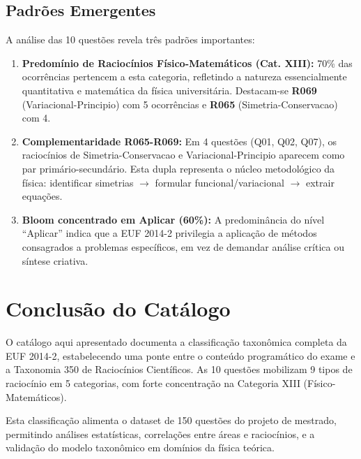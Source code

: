 \documentclass[12pt,a4paper]{article}
\newcommand{\rcode}[1]{\textcolor{azulprof}{\textbf{#1}}}
\begin{document}
\subsection{Padrões Emergentes}

A análise das 10 questões revela três padrões importantes:

\begin{enumerate}
  \item \textbf{Predomínio de Raciocínios Físico-Matemáticos (Cat. XIII):}
    70\% das ocorrências pertencem a esta categoria, refletindo a natureza
    essencialmente quantitativa e matemática da física universitária.
    Destacam-se \rcode{R069} (Variacional-Principio) com 5 ocorrências
    e \rcode{R065} (Simetria-Conservacao) com 4.

  \item \textbf{Complementaridade R065-R069:} Em 4 questões (Q01, Q02, Q07),
    os raciocínios de Simetria-Conservacao e Variacional-Principio
    aparecem como par primário-secundário. Esta dupla representa o núcleo
    metodológico da física: identificar simetrias $\to$ formular
    funcional/variacional $\to$ extrair equações.

  \item \textbf{Bloom concentrado em Aplicar (60\%):} A predominância do
    nível ``Aplicar'' indica que a EUF 2014-2 privilegia a aplicação de
    métodos consagrados a problemas específicos, em vez de demandar
    análise crítica ou síntese criativa.
\end{enumerate}

\section{Conclusão do Catálogo}

O catálogo aqui apresentado documenta a classificação taxonômica completa
da EUF 2014-2, estabelecendo uma ponte entre o conteúdo programático do
exame e a Taxonomia 350 de Raciocínios Científicos. As 10 questões
mobilizam 9 tipos de raciocínio em 5 categorias, com forte concentração
na Categoria XIII (Físico-Matemáticos).

Esta classificação alimenta o dataset de 150 questões do projeto de
mestrado, permitindo análises estatísticas, correlações entre áreas e
raciocínios, e a validação do modelo taxonômico em domínios da física
teórica.
\end{document}
